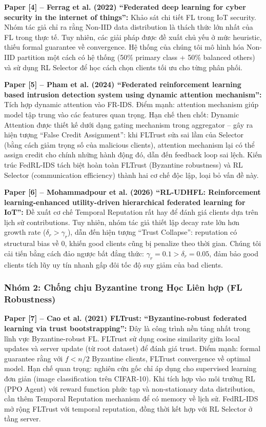 \documentclass[12pt,a4paper]{article}
\begin{document}
\textbf{Paper [4] -- Ferrag et al. (2022) ``Federated deep learning for cyber security in the internet of things'': } Khảo sát chi tiết FL trong IoT security. Nhóm tác giả chỉ ra rằng Non-IID data distribution là thách thức lớn nhất của FL trong thực tế. Tuy nhiên, các giải pháp được đề xuất chủ yếu ở mức heuristic, thiếu formal guarantee về convergence. Hệ thống của chúng tôi mô hình hóa Non-IID partition một cách có hệ thống (50\% primary class + 50\% balanced others) và sử dụng RL Selector để học cách chọn clients tối ưu cho từng phân phối.

\textbf{Paper [5] -- Pham et al. (2024) ``Federated reinforcement learning based intrusion detection system using dynamic attention mechanism'': } Tích hợp dynamic attention vào FR-IDS. Điểm mạnh: attention mechanism giúp model tập trung vào các features quan trọng. Hạn chế then chốt: Dynamic Attention được thiết kế dưới dạng gating mechanism trong aggregator -- gây ra hiện tượng ``False Credit Assignment'': khi FLTrust sửa sai lầm của Selector (bằng cách giảm trọng số của malicious clients), attention mechanism lại có thể assign credit cho chính những hành động đó, dẫn đến feedback loop sai lệch. Kiến trúc FedRL-IDS tách biệt hoàn toàn FLTrust (Byzantine robustness) và RL Selector (communication efficiency) thành hai cơ chế độc lập, loại bỏ vấn đề này.

\textbf{Paper [6] -- Mohammadpour et al. (2026) ``RL-UDHFL: Reinforcement learning-enhanced utility-driven hierarchical federated learning for IoT'': } Đề xuất cơ chế Temporal Reputation rất hay để đánh giá clients dựa trên lịch sử contributions. Tuy nhiên, nhóm tác giả thiết lập decay rate lớn hơn growth rate ($\delta_r > \gamma_r$), dẫn đến hiện tượng ``Trust Collapse'': reputation có structural bias về 0, khiến good clients cũng bị penalize theo thời gian. Chúng tôi cải tiến bằng cách đảo ngược bất đẳng thức: $\gamma_r = 0.1 > \delta_r = 0.05$, đảm bảo good clients tích lũy uy tín nhanh gấp đôi tốc độ suy giảm của bad clients.

\subsubsection{Nhóm 2: Chống chịu Byzantine trong Học Liên hợp (FL Robustness)}

\textbf{Paper [7] -- Cao et al. (2021) FLTrust: ``Byzantine-robust federated learning via trust bootstrapping'': } Đây là công trình nền tảng nhất trong lĩnh vực Byzantine-robust FL. FLTrust sử dụng cosine similarity giữa local updates và server update (từ root dataset) để đánh giá trust. Điểm mạnh: formal guarantee rằng với $f < n/2$ Byzantine clients, FLTrust convergence về optimal model. Hạn chế quan trọng: nghiên cứu gốc chỉ áp dụng cho supervised learning đơn giản (image classification trên CIFAR-10). Khi tích hợp vào môi trường RL (PPO Agent) với reward function phức tạp và non-stationary data distribution, cần thêm Temporal Reputation mechanism để có memory về lịch sử. FedRL-IDS mở rộng FLTrust với temporal reputation, đồng thời kết hợp với RL Selector ở tầng server.
\end{document}
